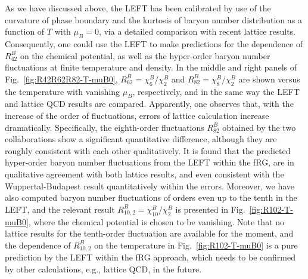 \documentclass[%
reprint,
superscriptaddress,
showpacs,preprintnumbers,
 amsmath,amssymb,
 aps,
prd,
]{revtex4-1}
\def\Fig#1{Fig.~\ref{#1}} \def\Tab#1{Tab.~\ref{#1}}
\begin{document}
As we have discussed above, the LEFT has been calibrated by use of the curvature of phase boundary and the kurtosis of baryon number distribution as a function of $T$ with $\mu_B=0$, via a detailed comparison with recent lattice results. Consequently, one could use the LEFT to make predictions for the dependence of $R^{B}_{42}$ on the chemical potential, as well as the hyper-order baryon number fluctuations at finite temperature and density. In the middle and right panels of \Fig{fig:R42R62R82-T-muB0}, $R^{B}_{62}=\chi^{B}_{6}/\chi^{B}_{2}$ and $R^{B}_{82}=\chi^{B}_{8}/\chi^{B}_{2}$ are shown versus the temperature with vanishing $\mu_B$, respectively, and in the same way the LEFT and lattice QCD results are compared. Apparently, one observes that, with the increase of the order of fluctuations, errors of lattice calculation increase dramatically. Specifically, the eighth-order fluctuations $R^{B}_{82}$ obtained by the two collaborations show a significant quantitative difference, although they are roughly consistent with each other qualitatively. It is found that the predicted hyper-order baryon number fluctuations from the LEFT within the fRG, are in qualitative agreement with both lattice results, and even consistent with the Wuppertal-Budapest result quantitatively within the errors. Moreover, we have also computed baryon number fluctuations of orders even up to the tenth in the LEFT, and the relevant result $R^{B}_{10,2}=\chi^{B}_{10}/\chi^{B}_{2}$ is presented in \Fig{fig:R102-T-muB0}, where the chemical potential is chosen to be vanishing. Note that no lattice results for the tenth-order fluctuation are available for the moment, and the dependence of $R^{B}_{10,2}$ on the temperature in \Fig{fig:R102-T-muB0} is a pure prediction by the LEFT within the fRG approach, which needs to be confirmed by other calculations, e.g., lattice QCD, in the future.
\end{document}
